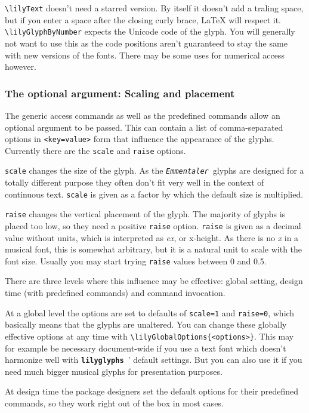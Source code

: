 \documentclass{article}
\newcommand*{\lilyglyphs}{\texttt{\textbf{lilyglyphs\,}}}
\newcommand*{\emmentaler}{\texttt{\textit{Emmentaler }}}
\newcommand*{\cmd}[1]{\texttt{\textbackslash #1}}
\begin{document}
\cmd{lilyText} doesn't need a starred version. 
By itself it doesn't add a traling space, but if you enter a space after the closing curly brace, \LaTeX{} will respect it.\\

\cmd{lilyGlyphByNumber} expects the Unicode code of the glyph. 
You will generally not want to use this as the code positions aren't guaranteed to stay the same with new versions of the fonts. 
There may be some uses for numerical access however.

\subsubsection{The optional argument: Scaling and placement}
The generic access commands as well as the predefined commands allow an optional argument to be passed.
This can contain a list of comma-separated options in \texttt{<key=value>} form that influence the appearance of the glyphs. Currently there are the \texttt{scale} and \texttt{raise} options.

\texttt{scale} changes the size of the glyph. 
As the \emmentaler glyphs are designed for a totally different purpose they often don't fit very well in the context of continuous text.
\texttt{scale} is given as a factor by which the default size is multiplied.

\texttt{raise} changes the vertical placement of the glyph.
The majority of glyphs is placed too low, so they need a positive \texttt{raise} option.
\texttt{raise} is given as a decimal value without units, which is interpreted as \emph{ex}, or x-height. 
As there is no \emph{x} in a musical font, this is somewhat arbitrary, but it is a natural unit to scale with the font size.
Usually you may start trying \texttt{raise} values between 0 and 0.5.

There are three levels where this influence may be effective: global setting, design time (with predefined commands) and command invocation.

At a global level the options are set to defaults of \texttt{scale=1} and \texttt{raise=0}, which basically means that the glyphs are unaltered.
You can change these globally effective options at any time with \cmd{lilyGlobalOptions\{<options>\}}.
This may for example be necessary document-wide if you use a text font which doesn't harmonize well with \lilyglyphs' default settings.
But you can also use it if you need much bigger musical glyphs for presentation purposes.

At design time the package designers set the default options for their predefined commands, so they work right out of the box in most cases.
\end{document}
